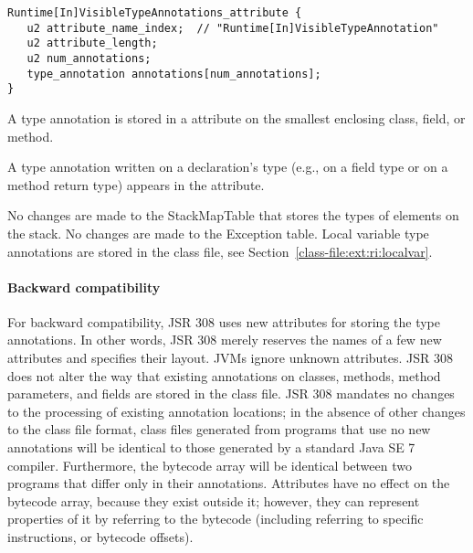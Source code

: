 \documentclass[10pt]{article}
\begin{document}
\preverbnegspace
\begin{Verbatim}
Runtime[In]VisibleTypeAnnotations_attribute {
   u2 attribute_name_index;  // "Runtime[In]VisibleTypeAnnotation"
   u2 attribute_length;
   u2 num_annotations;
   type_annotation annotations[num_annotations];
}
\end{Verbatim}


A type annotation is stored in a \RuntimeInOrVisibleTypeAnnotations attribute
on the smallest enclosing class, field, or method.

A type annotation written on a declaration's type (e.g., on a field type or
on a method return type)
appears in the \RuntimeInOrVisibleTypeAnnotations attribute.


No changes are made to the StackMapTable that stores the types of elements
on the stack.
No changes are made to the Exception table.
Local variable type annotations are stored in the class file, see
Section~\ref{class-file:ext:ri:localvar}.


\paragraph{Backward compatibility}
For backward compatibility, JSR 308 uses new attributes for storing
the type annotations.  In other words, JSR 308 merely reserves the
names of a few new attributes and specifies their layout.
JVMs ignore unknown
attributes.
JSR 308 does
not alter the way that existing annotations on classes, methods, method parameters,
and fields are stored in the class file.
JSR 308 mandates no changes to the processing of existing annotation locations;
in the absence of other changes to the class file format,
class files generated from programs that use no new
annotations will be identical to those generated by a standard Java SE 7
compiler.
Furthermore, the bytecode array will be identical between two programs that
differ only in their annotations.
Attributes have no effect on the bytecode array, because they exist outside
it; however, they can represent properties of it by referring to the
bytecode (including referring to specific instructions, or bytecode offsets).
\end{document}
